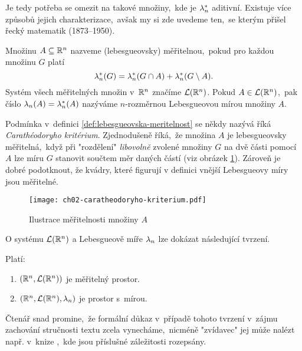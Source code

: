 Je tedy potřeba se omezit na takové množiny,~kde je $\lambda_n^*$ aditivní. Existuje více způsobů jejich charakterizace,~avšak my si zde uvedeme ten,~se kterým přišel řecký matematik  (1873--1950).
\begin{definition}\label{def:lebesgueovska-meritelnost}
    Množinu $A\subseteq\mathbb{R}^n$ nazveme (lebesgueovsky) měřitelnou,~pokud pro každou množinu $G$ platí
    \[\lambda_n^*(G)=\lambda_n^*(G\cap A)+\lambda_n^*(G\setminus A).\]
    Systém všech měřitelných množin v~$\mathbb{R}^n$ značíme $\mathcal{L}(\mathbb{R}^n)$.  Pokud $A\in\mathcal{L}(\mathbb{R}^n)$,~pak číslo $\lambda_n(A)=\lambda_n^*(A)$ nazýváme $n$-rozměrnou Lebesgueovou mírou množiny $A$.
\end{definition}
Podmínka v~definici \ref{def:lebesgueovska-meritelnost} se někdy nazývá říká \emph{Carathéodoryho kritérium}. Zjednodušeně říká,~že množina $A$ je lebesgueovsky měřitelná,~když při "rozdělení" \emph{libovolně} zvolené množiny $G$ na dvě části pomocí $A$ lze míru $G$ stanovit součtem měr daných částí (viz obrázek \ref{fig:caratheodoryho-kriterium}). Zároveň je dobré podotknout, že kvádry, které figurují v definici vnější Lebesgueovy míry jsou měřitelné.
\begin{figure}[h]
    \centering
    \texttt{[image: ch02-caratheodoryho-kriterium.pdf]}
    \caption{Ilustrace měřitelnosti množiny $A$}
    \label{fig:caratheodoryho-kriterium}
\end{figure}
O systému $\mathcal{L}(\mathbb{R}^n)$ a Lebesgueově míře $\lambda_n$ lze dokázat následující tvrzení.
\begin{theorem}\label{thm:prostor-s-Lebesgueovou-mirou}
    Platí:
    \begin{enumerate}[label=(\roman*)]
        \item $(\mathbb{R}^n,\mathcal{L}(\mathbb{R}^n))$ je měřitelný prostor.
        \item $(\mathbb{R}^n,\mathcal{L}(\mathbb{R}^n),\lambda_n)$ je prostor s~mírou.
    \end{enumerate}
\end{theorem}
Čtenář snad promine,~že formální důkaz v~případě tohoto tvrzení v~zájmu zachování stručnosti textu zcela vynecháme,~nicméně "zvídavec" jej může nalézt např. v~knize \citep[str. 347]{Royden2010},~kde jsou příslušné záležitosti rozepsány.